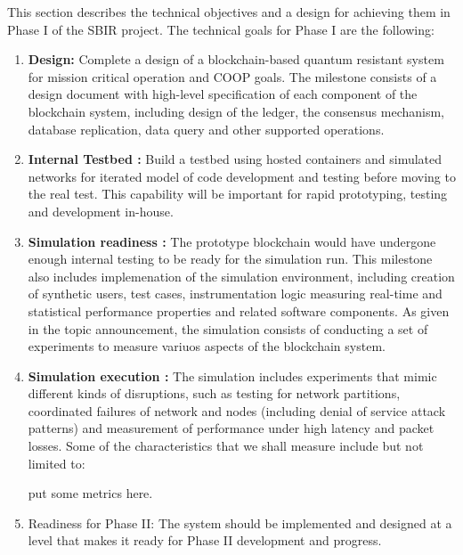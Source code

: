 This section describes the technical objectives and a design for achieving them in Phase I of the SBIR project. The
technical goals for Phase I are the following:

\begin{enumerate}

\item {\bf Design:} Complete a design of a blockchain-based quantum resistant system for mission critical operation and
COOP goals. The milestone consists of a design document with high-level specification of each component of the
blockchain system, including design of the ledger, the consensus mechanism, database replication, data query and other
supported operations.

\item {\bf Internal Testbed :} Build a testbed using hosted containers and simulated networks for iterated model of code development and testing
before moving to the real test. This capability will be important for rapid prototyping, testing and development in-house.

\item {\bf Simulation readiness :} The prototype blockchain would have undergone enough internal testing to be ready for
the simulation run. This milestone also includes implemenation of the simulation environment, including creation of
synthetic users, test cases, instrumentation logic measuring real-time and statistical performance properties and
related software components. As given in the topic announcement, the simulation consists of conducting a set of
experiments to measure variuos aspects of the blockchain system. 
 
\item {\bf Simulation execution :} The simulation includes experiments that mimic different kinds of disruptions, such as
testing for network partitions, coordinated failures of network and nodes (including denial of service attack patterns)
and measurement of performance under high latency and packet losses. Some of the characteristics that we shall measure
include but not limited to:

\begin{enumerate}

put some metrics here.

\end{enumerate}

\item {Readiness for Phase II:} The system should be implemented and designed at a level that makes it ready for Phase
II development and progress.
\end{enumerate}


